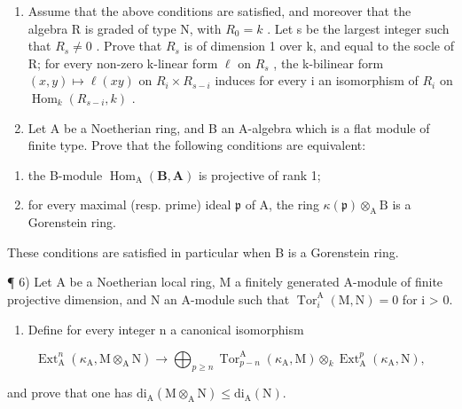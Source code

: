 \begin{enumerate}
\def\labelenumi{\alph{enumi})}
\setcounter{enumi}{1}
\item
  Assume that the above conditions are satisfied, and moreover that the algebra R is graded of type N, with \(R_{0} = k\) . Let s be the largest integer such that \(R_{s} \neq 0\) . Prove that \(R_{s}\) is of dimension 1 over k, and equal to the socle of R; for every non-zero k-linear form \(\ell\) on \(R_{s}\) , the k-bilinear form \((x, y) \mapsto \ell(xy)\) on \(R_{i} \times R_{s- i}\) induces for every i an isomorphism of \(R_{i}\) on \(\operatorname{Hom}_{k}(R_{s-i}, k)\) .
\item
  Let A be a Noetherian ring, and B an A-algebra which is a flat module of finite type. Prove that the following conditions are equivalent:
\end{enumerate}

\begin{enumerate}
\def\labelenumi{(\roman{enumi})}
\item
  the B-module \(\operatorname{Hom}_{\mathrm{A}}(\mathbf{B},\mathbf{A})\) is projective of rank 1;
\item
  for every maximal (resp. prime) ideal \(\mathfrak{p}\) of A, the ring \(\kappa(\mathfrak{p})\otimes_{\mathrm{A}}\mathrm{B}\) is a Gorenstein ring.
\end{enumerate}

These conditions are satisfied in particular when B is a Gorenstein ring.

¶ 6) Let A be a Noetherian local ring, M a finitely generated A-module of finite projective dimension, and N an A-module such that \(\operatorname{Tor}_{i}^{\mathrm{A}}(\mathrm{M},\mathrm{N}) = 0\) for i \textgreater{} 0.

\begin{enumerate}
\def\labelenumi{\alph{enumi})}
\tightlist
\item
  Define for every integer n a canonical isomorphism
\end{enumerate}

\[
\operatorname{Ext} _ {\mathrm{A}} ^ {n} (\kappa_ {\mathrm{A}}, \mathrm{M} \otimes_ {\mathrm{A}} \mathrm{N}) \longrightarrow \bigoplus_ {p \geqslant n} \operatorname{Tor} _ {p - n} ^ {\mathrm{A}} (\kappa_ {\mathrm{A}}, \mathrm{M}) \otimes_ {k} \operatorname{Ext} _ {\mathrm{A}} ^ {p} (\kappa_ {\mathrm{A}}, \mathrm{N}),
\]

and prove that one has \(\mathrm{di}_{\mathrm{A}}(\mathrm{M}\otimes_{\mathrm{A}}\mathrm{N})\leqslant \mathrm{di}_{\mathrm{A}}(\mathrm{N})\).

